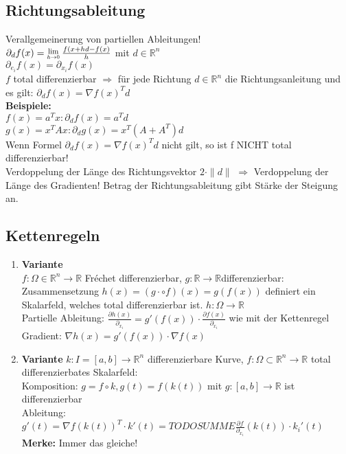 \documentclass[german]{latex4ei/latex4ei_sheet}
\begin{document}
\begin{sectionbox}	
	\subsection{Richtungsableitung}
	Verallgemeinerung von partiellen Ableitungen!\\
	$\partial_d f(x) = \Lim{h \to 0} \frac{f(x+h d - f(x)}{h}$ mit $d \in \mathbb{R}^n$\\
	$\partial_{e_i} f(x)=\partial_{x_i} f(x)$\\
	$f$ total differenzierbar $\Rightarrow$ f\"ur jede Richtung $d \in \mathbb{R}^n$ die Richtungsanleitung und es gilt: $\partial_d f(x)=\nabla f(x)^T d$\\
  \textbf{Beispiele:}\\
	$f(x)=a^T x: \partial_d f(x)=a^T d$\\
	$g(x)=x^T A x: \partial_d g(x)=x^T (A+A^T) d$\\
	Wenn Formel $\partial_d f(x)=\nabla f(x)^T d$ nicht gilt, so ist f NICHT total differenzierbar!\\
	Verdoppelung der Länge des Richtungsvektor $2 \cdot \|d\|$ $\Rightarrow$ Verdoppelung der L\"ange des Gradienten!
	Betrag der Richtungsableitung gibt St\"arke der Steigung an.
\end{sectionbox}
\begin{sectionbox}	
	\subsection{Kettenregeln}
	\begin{enumerate}
	\item \textbf{Variante}\\
	$f:\Omega \in \mathbb{R}^n \rightarrow \mathbb{R}$ Fr\'echet differenzierbar, $g: \mathbb{R} \rightarrow \mathbb{R} $differenzierbar:\\
	Zusammensetzung $h(x)=(g \cdot \circ f)(x)=g(f(x))$ definiert ein Skalarfeld, welches total differenzierbar ist. $h: \Omega \rightarrow \mathbb{R}$\\
	Partielle Ableitung: $\frac{\partial h(x)}{\partial_{x_i}}=g'(f(x))\cdot \frac{\partial f(x)}{\partial_{x_i}}$ wie mit der Kettenregel\\
	Gradient: $\nabla h(x)=g'(f(x))\cdot \nabla f(x)$
	\item \textbf{Variante}
	$k:I=[a,b] \rightarrow \mathbb{R}^n$ differenzierbare Kurve, $f: \Omega \subset \mathbb{R}^n \rightarrow \mathbb{R}$ total differenzierbates Skalarfeld:\\
	Komposition: $g = f \circ k, g(t)=f(k(t))$ mit $g: [a,b] \rightarrow \mathbb{R}$ ist differenzierbar\\
	Ableitung: $g'(t)=\nabla f(k(t))^T \cdot k'(t)=TODOSUMME \frac{\partial f}{\partial_{x_i}} (k(t)) \cdot k_i'(t)$\\
	\textbf{Merke:}	Immer das gleiche!
	\end{enumerate}
\end{sectionbox}
\end{document}
